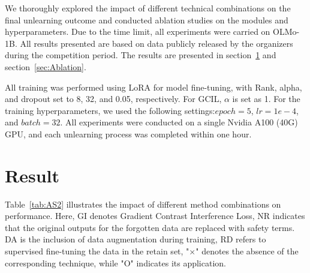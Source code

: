 \documentclass[11pt]{article}
\begin{document}

We thoroughly explored the impact of different technical combinations on the final unlearning outcome and conducted ablation studies on the modules and hyperparameters. Due to the time limit, all experiments were carried on OLMo-1B. All results presented are based on data publicly released by the organizers during the competition period. The results are presented in section~\ref{sec:Result} and section~\ref{sec:Ablation}.

All training was performed using LoRA \cite{hu2022lora} for model fine-tuning, with Rank, alpha, and dropout set to 8, 32, and 0.05, respectively. 
For GCIL, $\alpha$ is set as 1. For the training hyperparameters, we used the following settings:$epoch=5$, $lr=1e-4$, and $batch=32$. All experiments were conducted on a single Nvidia A100 (40G) GPU, and each unlearning process was completed within one hour.

\section{Result}
\label{sec:Result}



Table~\ref{tab:AS2} illustrates the impact of different method combinations on performance. Here, GI denotes Gradient Contrast Interference Loss, NR indicates that the original outputs for the forgotten data are replaced with safety terms. DA is the inclusion of data augmentation during training, RD refers to supervised fine-tuning the data in the retain set,
"×" denotes the absence of the corresponding technique, while "O" indicates its application.
\end{document}
